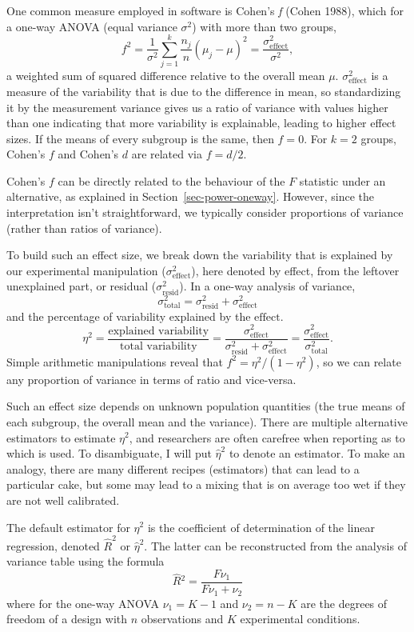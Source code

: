 \documentclass[
  11pt,
  letterpaper,
]{scrbook}
\theoremstyle{definition}
\theoremstyle{definition}
\theoremstyle{remark}
\begin{document}
One common measure employed in software is Cohen's \emph{f} (Cohen
1988), which for a one-way ANOVA (equal variance \(\sigma^2\)) with more
than two groups, \[
f^2 = \frac{1}{\sigma^2} \sum_{j=1}^k \frac{n_j}{n}(\mu_j - \mu)^2 = \frac{\sigma^2_{\text{effect}}}{\sigma^2},
\] a weighted sum of squared difference relative to the overall mean
\(\mu\). \(\sigma^2_{\text{effect}}\) is a measure of the variability
that is due to the difference in mean, so standardizing it by the
measurement variance gives us a ratio of variance with values higher
than one indicating that more variability is explainable, leading to
higher effect sizes. If the means of every subgroup is the same, then
\(f=0\). For \(k=2\) groups, Cohen's \(f\) and Cohen's \(d\) are related
via \(f=d/2\).

Cohen's \(f\) can be directly related to the behaviour of the \(F\)
statistic under an alternative, as explained in
Section~\ref{sec-power-oneway}. However, since the interpretation isn't
straightforward, we typically consider proportions of variance (rather
than ratios of variance).

To build such an effect size, we break down the variability that is
explained by our experimental manipulation (\(\sigma^2_\text{effect}\)),
here denoted by effect, from the leftover unexplained part, or residual
(\(\sigma^2_\text{resid}\)). In a one-way analysis of variance,
\[\sigma^2_{\text{total}} = \sigma^2_{\text{resid}} + \sigma^2_{\text{effect}}\]
and the percentage of variability explained by the \(\text{effect}\).
\[\eta^2 = \frac{\text{explained variability}}{\text{total variability}}= \frac{\sigma^2_{\text{effect}}}{\sigma^2_{\text{resid}} + \sigma^2_{\text{effect}}} = \frac{\sigma^2_{\text{effect}}}{\sigma^2_{\text{total}}}.\]
Simple arithmetic manipulations reveal that \(f^2 = \eta^2/(1-\eta^2)\),
so we can relate any proportion of variance in terms of ratio and
vice-versa.

Such an effect size depends on unknown population quantities (the true
means of each subgroup, the overall mean and the variance). There are
multiple alternative estimators to estimate \(\eta^2\), and researchers
are often carefree when reporting as to which is used. To disambiguate,
I will put \(\hat{\eta}^2\) to denote an estimator. To make an analogy,
there are many different recipes (estimators) that can lead to a
particular cake, but some may lead to a mixing that is on average too
wet if they are not well calibrated.

The default estimator for \(\eta^2\) is the coefficient of determination
of the linear regression, denoted \(\widehat{R}^2\) or
\(\widehat{\eta}^2\). The latter can be reconstructed from the analysis
of variance table using the formula \[
\widehat{R}{}^2 = \frac{F\nu_1}{F\nu_1 + \nu_2}
\] where for the one-way ANOVA \(\nu_1 = K-1\) and \(\nu_2 = n-K\) are
the degrees of freedom of a design with \(n\) observations and \(K\)
experimental conditions.
\end{document}
